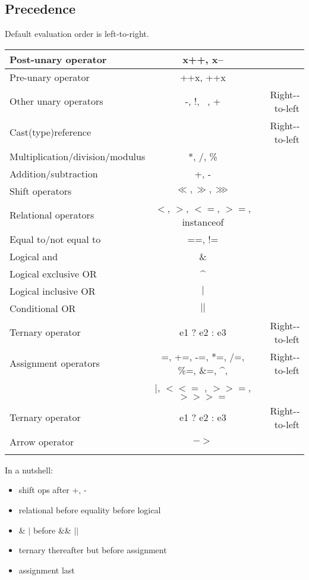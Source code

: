 \documentclass{scrartcl}
\begin{document}
\subsection{Precedence}

    Default evaluation order is left-to-right.

    \begin{tabular}{|l|c|r|}
        \hline
        Post-­unary operator& x++, x-- &  \\
        \hline
        Pre-­unary operator& ++x, ++x &  \\
        \hline
        Other unary operators& -­, !, ~, + &  Right-­to-­left \\
        \hline
        Cast(type)reference&  &  Right-­to-­left \\
        \hline
        Multiplication/division/modulus& *, /, \% &  \\
        \hline
        Addition/subtraction& +, - &  \\
        \hline
        Shift operators& $\ll, \gg, \ggg$ &  \\
        \hline
        Relational operators & $<$, $>$, $<=$, $>=$, instanceof & \\
        \hline
        Equal to/not equal to& ==, != &\\
        \hline
        Logical and& \& &  \\
        \hline
        Logical exclusive OR& \textasciicircum \\
        \hline
        Logical inclusive OR& $|$ &  \\
        \hline
        Conditional OR& $||$ &  \\
        \hline
        Ternary operator& e1 ? e2 : e3 & Right-­to-­left\\
        \hline
        Assignment operators& =, +=, -­=, *=, /=, \%=, \&=, \textasciicircum, & Right-­to-­left\\
        & $|$, $<<=$ , $>>=$, $>>>=$ & \\
        \hline
        Ternary operator& e1 ? e2 : e3 & Right-­to-­left\\
        \hline
        Arrow operator& $->$ &  \\\\
        \hline
    \end{tabular}

    In a nutshell:
    \begin{itemize}
        \item shift ops after +, -
        \item relational before equality before logical
        \item \& $|$ before \&\& $||$
        \item ternary thereafter but before assignment
        \item assignment last
    \end{itemize}
\end{document}

